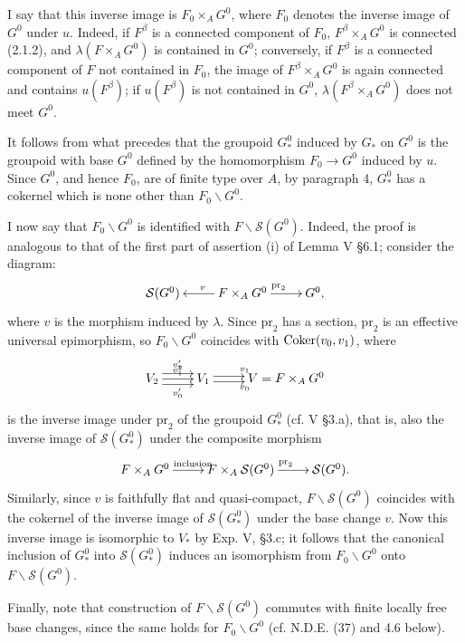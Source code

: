 I say that this inverse image is $F_0\times_AG^0$, where $F_0$ denotes the inverse image of $G^0$ under $u$. Indeed, if $F^\beta$ is a connected component of $F_0$, $F^\beta\times_AG^0$ is connected (2.1.2), and $\lambda(F\times_AG^0)$ is contained in $G^0$; conversely, if $F^\beta$ is a connected component of $F$ not contained in $F_0$, the image of $F^\beta\times_AG^0$ is again connected and contains $u(F^\beta)$; if $u(F^\beta)$ is not contained in $G^0$, $\lambda(F^\beta\times_AG^0)$ does not meet $G^0$.

It follows from what precedes that the groupoid $G^0_*$ induced by $G_*$ on $G^0$ is the groupoid with base $G^0$ defined by the homomorphism $F_0\to G^0$ induced by $u$. Since $G^0$, and hence $F_0$, are of finite type over $A$, by paragraph 4, $G^0_*$ has a cokernel which is none other than $F_0\backslash G^0$.

I now say that $F_0\backslash G^0$ is identified with $F\backslash\mathcal S(G^0)$. Indeed, the proof is analogous to that of the first part of assertion (i) of Lemma V §6.1; consider the diagram:
\[
\xymatrix{\mathcal S(G^0)&F\times_AG^0\ar[l]_v\ar[r]^{\mathrm{pr}_2}&G^0,}
\]
where $v$ is the morphism induced by $\lambda$. Since $\mathrm{pr}_2$ has a section, $\mathrm{pr}_2$ is an effective universal epimorphism, so $F_0\backslash G^0$ coincides with $\operatorname{Coker}(v_0,v_1)$, where
\[
\xymatrix{V_2\ar@<1ex>[r]^{v'_2}\ar[r]^{v'_1}\ar@<-1ex>[r]_{v'_0}&V_1\ar@<.5ex>[r]^{v_1}\ar@<-.5ex>[r]_{v_0}&V=F\times_AG^0}
\]
is the inverse image under $\mathrm{pr}_2$ of the groupoid $G^0_*$ (cf. V §3.a), that is, also the inverse image of $\mathcal S(G^0_*)$ under the composite morphism
\[
\xymatrix{F\times_AG^0\ar[r]^{\text{inclusion}}&F\times_A\mathcal S(G^0)\ar[r]^{\mathrm{pr}_2}&\mathcal S(G^0).}
\]
Similarly, since $v$ is faithfully flat and quasi-compact, $F\backslash\mathcal S(G^0)$ coincides with the cokernel of the inverse image of $\mathcal S(G^0_*)$ under the base change $v$. Now this inverse image is isomorphic to $V_*$ by Exp. V, §3.c; it follows that the canonical inclusion of $G^0_*$ into $\mathcal S(G^0_*)$ induces an isomorphism from $F_0\backslash G^0$ onto $F\backslash\mathcal S(G^0)$.

Finally, note that construction of $F\backslash\mathcal S(G^0)$ commutes with finite locally free base changes, since the same holds for $F_0\backslash G^0$ (cf. N.D.E. (37) and 4.6 below).

